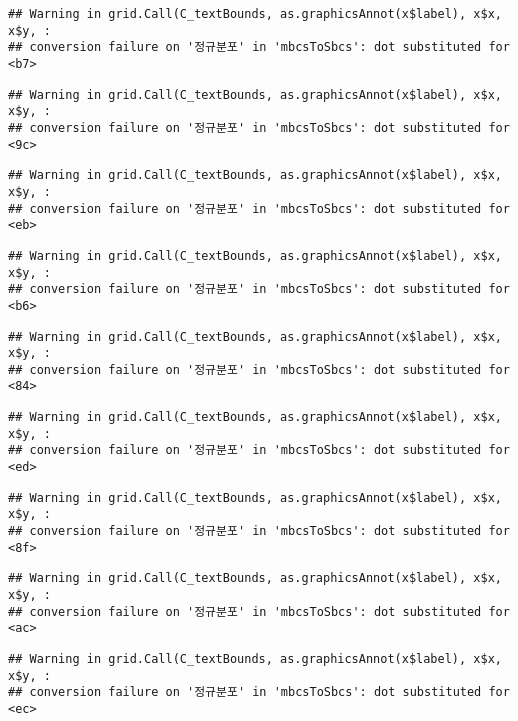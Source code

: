 \documentclass[]{book}
\begin{document}
\begin{verbatim}
## Warning in grid.Call(C_textBounds, as.graphicsAnnot(x$label), x$x, x$y, :
## conversion failure on '정규분포' in 'mbcsToSbcs': dot substituted for <b7>
\end{verbatim}

\begin{verbatim}
## Warning in grid.Call(C_textBounds, as.graphicsAnnot(x$label), x$x, x$y, :
## conversion failure on '정규분포' in 'mbcsToSbcs': dot substituted for <9c>
\end{verbatim}

\begin{verbatim}
## Warning in grid.Call(C_textBounds, as.graphicsAnnot(x$label), x$x, x$y, :
## conversion failure on '정규분포' in 'mbcsToSbcs': dot substituted for <eb>
\end{verbatim}

\begin{verbatim}
## Warning in grid.Call(C_textBounds, as.graphicsAnnot(x$label), x$x, x$y, :
## conversion failure on '정규분포' in 'mbcsToSbcs': dot substituted for <b6>
\end{verbatim}

\begin{verbatim}
## Warning in grid.Call(C_textBounds, as.graphicsAnnot(x$label), x$x, x$y, :
## conversion failure on '정규분포' in 'mbcsToSbcs': dot substituted for <84>
\end{verbatim}

\begin{verbatim}
## Warning in grid.Call(C_textBounds, as.graphicsAnnot(x$label), x$x, x$y, :
## conversion failure on '정규분포' in 'mbcsToSbcs': dot substituted for <ed>
\end{verbatim}

\begin{verbatim}
## Warning in grid.Call(C_textBounds, as.graphicsAnnot(x$label), x$x, x$y, :
## conversion failure on '정규분포' in 'mbcsToSbcs': dot substituted for <8f>
\end{verbatim}

\begin{verbatim}
## Warning in grid.Call(C_textBounds, as.graphicsAnnot(x$label), x$x, x$y, :
## conversion failure on '정규분포' in 'mbcsToSbcs': dot substituted for <ac>
\end{verbatim}

\begin{verbatim}
## Warning in grid.Call(C_textBounds, as.graphicsAnnot(x$label), x$x, x$y, :
## conversion failure on '정규분포' in 'mbcsToSbcs': dot substituted for <ec>
\end{verbatim}
\end{document}

